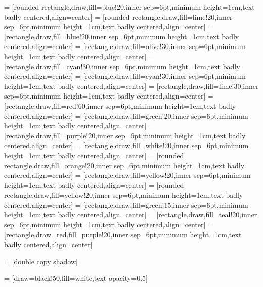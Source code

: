 
 = [rounded rectangle,draw,fill=blue!20,inner sep=6pt,minimum height=1cm,text badly centered,align=center]
 = [rounded rectangle,draw,fill=lime!20,inner sep=6pt,minimum height=1cm,text badly centered,align=center]
 = [rectangle,draw,fill=blue!20,inner sep=6pt,minimum height=1cm,text badly centered,align=center]
 = [rectangle,draw,fill=olive!30,inner sep=6pt,minimum height=1cm,text badly centered,align=center]
 = [rectangle,draw,fill=cyan!30,inner sep=6pt,minimum height=1cm,text badly centered,align=center]
 = [rectangle,draw,fill=cyan!30,inner sep=6pt,minimum height=1cm,text badly centered,align=center]
 = [rectangle,draw,fill=lime!30,inner sep=6pt,minimum height=1cm,text badly centered,align=center]
 = [rectangle,draw,fill=red!60,inner sep=6pt,minimum height=1cm,text badly centered,align=center]
 = [rectangle,draw,fill=green!20,inner sep=6pt,minimum height=1cm,text badly centered,align=center]
 = [rectangle,draw,fill=purple!20,inner sep=6pt,minimum height=1cm,text badly centered,align=center]
 = [rectangle,draw,fill=white!20,inner sep=6pt,minimum height=1cm,text badly centered,align=center]
 = [rounded rectangle,draw,fill=orange!20,inner sep=6pt,minimum height=1cm,text badly centered,align=center]
 = [rectangle,draw,fill=yellow!20,inner sep=6pt,minimum height=1cm,text badly centered,align=center]
 = [rounded rectangle,draw,fill=yellow!20,inner sep=6pt,minimum height=1cm,text badly centered,align=center]
 = [rectangle,draw,fill=green!15,inner sep=6pt,minimum height=1cm,text badly centered,align=center]
 = [rectangle,draw,fill=teal!20,inner sep=6pt,minimum height=1cm,text badly centered,align=center]
 = [rectangle,draw=red,fill=purple!20,inner sep=6pt,minimum height=1cm,text badly centered,align=center]

 = [double copy shadow]

 = [draw=black!50,fill=white,text opacity=0.5]

